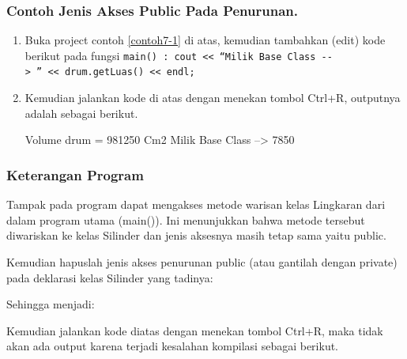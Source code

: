 \subsubsection*{Contoh Jenis Akses Public Pada Penurunan.}

\begin{enumerate}

\item Buka project contoh \ref{contoh7-1} di atas, kemudian tambahkan (edit) kode berikut
pada fungsi
\texttt{main()\ :\ cout\ \textless{}\textless{}\ ``Milik\ Base\ Class\ -\/-\textgreater{}\ ''\ \textless{}\textless{}\ drum.getLuas()\ \textless{}\textless{}\ endl;}



\item Kemudian jalankan kode di atas dengan menekan tombol Ctrl+R, outputnya
adalah sebagai berikut.
\begin{lcverbatim}
Volume drum = 981250 Cm2
Milik Base Class --> 7850
\end{lcverbatim}
\end{enumerate}

\subsubsection*{Keterangan Program}

Tampak pada program dapat mengakses metode warisan kelas Lingkaran dari
dalam program utama (main()). Ini menunjukkan bahwa metode tersebut
diwariskan ke kelas Silinder dan jenis aksesnya masih tetap sama yaitu
public.

Kemudian hapuslah jenis akses penurunan public (atau gantilah dengan
private) pada deklarasi kelas Silinder yang tadinya:



Sehingga menjadi:



Kemudian jalankan kode diatas dengan menekan tombol Ctrl+R, maka tidak
akan ada output karena terjadi kesalahan kompilasi sebagai berikut.

\begin{figure}[htbp]
\centering
{}

\end{figure}

